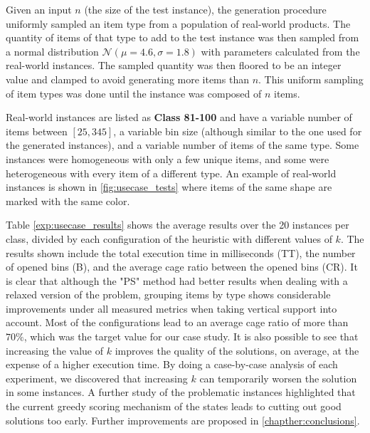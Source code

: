 Given an input $n$ (the size of the test instance), the generation procedure uniformly sampled an item type from a population of real-world products.
The quantity of items of that type to add to the test instance was then sampled from a normal distribution $\mathcal{N}(\mu = 4.6, \sigma = 1.8)$ with parameters calculated from the real-world instances.
The sampled quantity was then floored to be an integer value and clamped to avoid generating more items than $n$. 
This uniform sampling of item types was done until the instance was composed of $n$ items.

Real-world instances are listed as \textbf{Class 81-100} and have a variable number of items between $[25, 345]$, a variable bin size (although similar to the one used for the generated instances), and a variable number of items of the same type. Some instances were homogeneous with only a few unique items, and some were heterogeneous with every item of a different type.
An example of real-world instances is shown in \cref{fig:usecase_tests} where items of the same shape are marked with the same color.

Table \ref{exp:usecase_results} shows the average results over the 20 instances per class, divided by each configuration of the heuristic with different values of $k$.
The results shown include the total execution time in milliseconds (TT), the number of opened bins (B), and the average cage ratio between the opened bins (CR).
It is clear that although the "PS" method had better results when dealing with a relaxed version of the problem, grouping items by type shows considerable improvements under all measured metrics when taking vertical support into account.
Most of the configurations lead to an average cage ratio of more than $70\%$, which was the target value for our case study. %
It is also possible to see that increasing the value of $k$ improves the quality of the solutions, on average, at the expense of a higher execution time.
By doing a case-by-case analysis of each experiment, we discovered that increasing $k$ can temporarily worsen the solution in some instances. 
A further study of the problematic instances highlighted that the current greedy scoring mechanism of the states leads to cutting out good solutions too early. %
Further improvements are proposed in \cref{chapther:conclusions}.
\label{exp:usecase_results}

